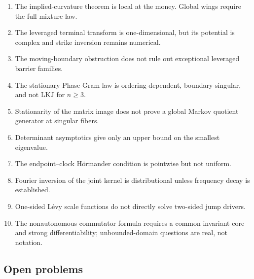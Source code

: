 \documentclass[
  english,
  11pt,
  letterpaper,
  DIV=11,
  numbers=noendperiod]{scrartcl}
\providecommand{\tightlist}{%
  \setlength{\itemsep}{0pt}\setlength{\parskip}{0pt}}
\theoremstyle{plain}
\theoremstyle{plain}
\theoremstyle{plain}
\theoremstyle{plain}
\theoremstyle{remark}
\begin{document}
\begin{enumerate}
\def\labelenumi{\arabic{enumi}.}
\tightlist
\item
  The implied-curvature theorem is local at the money. Global wings
  require the full mixture law.
\item
  The leveraged terminal transform is one-dimensional, but its potential
  is complex and strike inversion remains numerical.
\item
  The moving-boundary obstruction does not rule out exceptional
  leveraged barrier families.
\item
  The stationary Phase-Gram law is ordering-dependent,
  boundary-singular, and not LKJ for \(n\ge3\).
\item
  Stationarity of the matrix image does not prove a global Markov
  quotient generator at singular fibers.
\item
  Determinant asymptotics give only an upper bound on the smallest
  eigenvalue.
\item
  The endpoint--clock Hörmander condition is pointwise but not uniform.
\item
  Fourier inversion of the joint kernel is distributional unless
  frequency decay is established.
\item
  One-sided Lévy scale functions do not directly solve two-sided jump
  drivers.
\item
  The nonautonomous commutator formula requires a common invariant core
  and strong differentiability; unbounded-domain questions are real, not
  notation.
\end{enumerate}

\subsection{Open problems}\label{open-problems}
\end{document}
